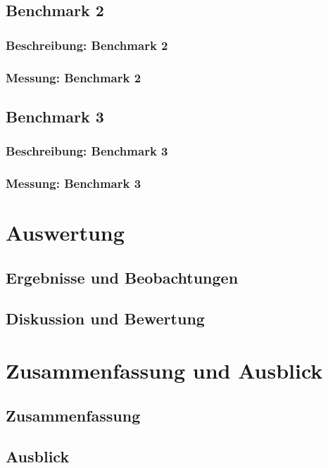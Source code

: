 \documentclass[fontsize=12pt,paper=a4,twoside=semi,parskip=half-,headsepline,headinclude]{scrreprt}
\begin{document}
\section{Benchmark 2}

\subsection{Beschreibung: Benchmark 2}

\subsection{Messung: Benchmark 2}

\section{Benchmark 3}

\subsection{Beschreibung: Benchmark 3}

\subsection{Messung: Benchmark 3}


\chapter{Auswertung}

\section{Ergebnisse und Beobachtungen}

\section{Diskussion und Bewertung}



\chapter{Zusammenfassung und Ausblick}

\section{Zusammenfassung}

\section{Ausblick}



\printbibliography


%
%
%
%
%
%
%
\end{document}
